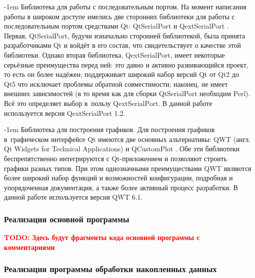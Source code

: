 \documentclass[a4paper, 14pt, titlepage]{extarticle}
\makeatletter
\newcommand{\todo}[1]{\textbf{\textcolor{red}{TODO: #1}}}
\newcommand{\eng}[1]{\foreignlanguage{english}{#1}}
\renewcommand{\paragraph}{%
    \@startsection{paragraph}{4}%
    {\parindent}{\z@}{-1em}%
    {\normalfont\normalsize\bfseries}%
  }
\makeatother
\begin{document}
  \paragraph{Библиотека для работы с последовательным портом.}
  На момент написания работы в широком доступе имелись две сторонних библиотеки для работы с
  последовательным портом средствами Qt: QtSerialPort \cite{qtserialport} и QextSerialPort \cite{qextserialport}.
  Первая, QtSerialPort, будучи изначально сторонней библиотекой, была принята разработчиками Qt и
  войдёт в его состав, что свидетельствует о качестве этой библиотеки. Однако вторая
  библиотека, QextSerialPort, имеет некоторые серьёзные преимущества перед ней: это давно и активно
  развивающийся проект, то есть он более надёжен; поддерживает широкий набор версий Qt от Qt2 до Qt5
  что исключает проблемы обратной совместимости; наконец, не имеет внешних зависимостей (в то время
  как для сборки QtSerialPort необходим Perl). Всё это определяет выбор в~пользу QextSerialPort.
  В данной работе используется версия QextSerialPort 1.2.

  \paragraph{Библиотека для построения графиков.}
  Для построения графиков в~графическом интерфейсе Qt имеются две основных альтернативы: QWT (англ.
  \eng{Qt Widgets for Technical Applications}) \cite{qwt} и QCustomPlot \cite{qcustomplot}.  Обе эти
  библиотеки беспрепятственно интегрируются с Qt-приложением и позволяют строить графики разных
  типов. При этом однозначными преимуществами QWT являются более широкий набор функций и
  возможностей конфигурации, подробная и упорядоченная документация, а также более активный процесс разработки.
  В данной работе используется версия QWT 6.1.


  \subsubsection{Реализация основной программы}\label{sssec:main-impl}

  \todo{Здесь будут фрагменты кода основной программы с комментариями}

  \subsubsection{Реализация программы обработки накопленных данных}
  
\end{document}
